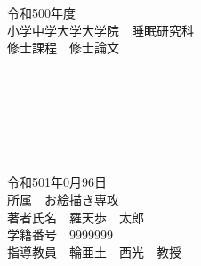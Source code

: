 \documentclass[main]{subfiles}
\begin{document}

\thispagestyle{empty}
\begin{center}

  \vspace{20mm}
  {\Large\noindent 令和500年度}\\
  \vspace{\baselineskip}
  {\Large\noindent 小学中学大学大学院　睡眠研究科}\\
  \vspace{\baselineskip}
  {\Large\noindent 修士課程　修士論文}\\
  \vspace{20mm}
  {\huge{}}\\
  \medskip
  {\huge\noindent{\LaTeX}}\\
  \medskip
  {\huge{}}\\
  \vspace{\baselineskip}
  {\huge{}}\\
  \medskip
  {\huge\noindent{\LaTeX}}\\
  \medskip
  {\huge{}}\\
  \vspace{20mm}

  {\Large\noindent
    令和501年0月96日\\
    \vspace{\baselineskip}
    所属　お絵描き専攻\\
    \vspace{\baselineskip}
    著者氏名　羅天歩　太郎\\
    \vspace{\baselineskip}
    学籍番号　9999999\\
    \vspace{\baselineskip}
    指導教員　輪亜土　西光　教授   \\
  }
  \vspace{40mm}

\end{center}

\thispagestyle{empty}
\clearpage

\end{document}
